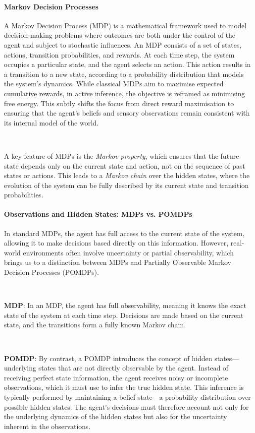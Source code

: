 \documentclass{article}
\begin{document}
\paragraph{Markov Decision Processes}

A Markov Decision Process (MDP) is a mathematical framework used to model decision-making problems where outcomes are both under the control of the agent and subject to stochastic influences. An MDP consists of a set of states, actions, transition probabilities, and rewards. At each time step, the system occupies a particular state, and the agent selects an action. This action results in a transition to a new state, according to a probability distribution that models the system’s dynamics. While classical MDPs aim to maximise expected cumulative rewards, in active inference, the objective is reframed as minimising free energy. This subtly shifts the focus from direct reward maximisation to ensuring that the agent’s beliefs and sensory observations remain consistent with its internal model of the world.

\

A key feature of MDPs is the \textit{Markov property}, which ensures that the future state depends only on the current state and action, not on the sequence of past states or actions. This leads to a \textit{Markov chain} over the hidden states, where the evolution of the system can be fully described by its current state and transition probabilities.

\paragraph{Observations and Hidden States: MDPs vs. POMDPs}

In standard MDPs, the agent has full access to the current state of the system, allowing it to make decisions based directly on this information. However, real-world environments often involve uncertainty or partial observability, which brings us to a distinction between MDPs and Partially Observable Markov Decision Processes (POMDPs).

\

\textbf{MDP}: In an MDP, the agent has full observability, meaning it knows the exact state of the system at each time step. Decisions are made based on the current state, and the transitions form a fully known Markov chain.

\

\textbf{POMDP}: By contrast, a POMDP introduces the concept of hidden states—underlying states that are not directly observable by the agent. Instead of receiving perfect state information, the agent receives noisy or incomplete observations, which it must use to infer the true hidden state. This inference is typically performed by maintaining a belief state—a probability distribution over possible hidden states. The agent’s decisions must therefore account not only for the underlying dynamics of the hidden states but also for the uncertainty inherent in the observations.
\end{document}
